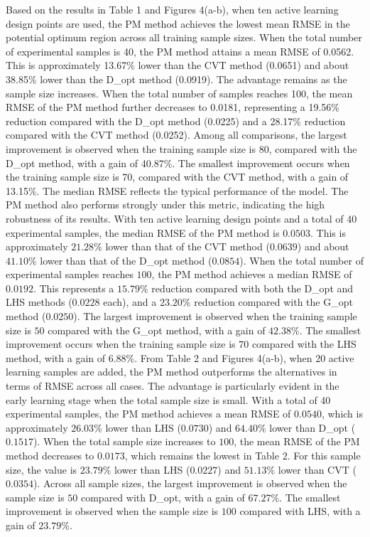 \documentclass[]{interact}
\theoremstyle{plain}%
\theoremstyle{definition}
\theoremstyle{remark}
\begin{document}
Based on the results in Table 1 and Figures 4(a-b), when ten active learning design points are used, the PM method achieves the lowest mean RMSE in the potential optimum region across all training sample sizes. When the total number of experimental samples is 40, the PM method attains a mean RMSE of 0.0562. This is approximately 13.67\% lower than the CVT method (0.0651) and about 38.85\% lower than the D\_opt method (0.0919). The advantage remains as the sample size increases. When the total number of samples reaches 100, the mean RMSE of the PM method further decreases to 0.0181, representing a 19.56\% reduction compared with the D\_opt method (0.0225) and a 28.17\% reduction compared with the CVT method (0.0252). Among all comparisons, the largest improvement is observed when the training sample size is 80, compared with the D\_opt method, with a gain of 40.87\%. The smallest improvement occurs when the training sample size is 70, compared with the CVT method, with a gain of 13.15\%.
The median RMSE reflects the typical performance of the model. The PM method also performs strongly under this metric, indicating the high robustness of its results. With ten active learning design points and a total of 40 experimental samples, the median RMSE of the PM method is $0.0503$. This is approximately $21.28\%$ lower than that of the CVT method ($0.0639$) and about $41.10\%$ lower than that of the D\_opt method ($0.0854$). When the total number of experimental samples reaches $100$, the PM method achieves a median RMSE of $0.0192$. This represents a $15.79\%$ reduction compared with both the D\_opt and LHS methods ($0.0228$ each), and a $23.20\%$ reduction compared with the G\_opt method ($0.0250$). The largest improvement is observed when the training sample size is $50$ compared with the G\_opt method, with a gain of $42.38\%$. The smallest improvement occurs when the training sample size is $70$ compared with the LHS method, with a gain of $6.88\%$.
From Table 2 and Figures 4(a-b), when 20 active learning samples are added, the PM method outperforms the alternatives in terms of RMSE across all cases. The advantage is particularly evident in the early learning stage when the total sample size is small. With a total of 40 experimental samples, the PM method achieves a mean RMSE of $0.0540$, which is approximately $26.03\%$ lower than LHS ($0.0730$) and $64.40\%$ lower than D\_opt ($0.1517$). When the total sample size increases to $100$, the mean RMSE of the PM method decreases to $0.0173$, which remains the lowest in Table 2. For this sample size, the value is $23.79\%$ lower than LHS ($0.0227$) and $51.13\%$ lower than CVT ($0.0354$). Across all sample sizes, the largest improvement is observed when the sample size is $50$ compared with D\_opt, with a gain of $67.27\%$. The smallest improvement is observed when the sample size is $100$ compared with LHS, with a gain of $23.79\%$.
\end{document}
